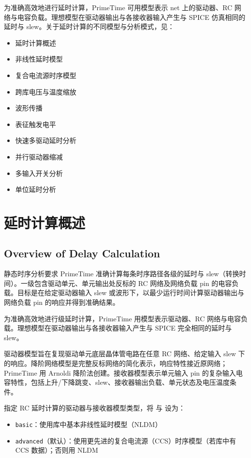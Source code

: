 \label{chap:delay}

为准确高效地进行延时计算，PrimeTime 可用模型表示 net 上的驱动器、RC 网络与电容负载。理想模型在驱动器输出与各接收器输入产生与 SPICE 仿真相同的延时与 slew。关于延时计算的不同模型与分析模式，见：
\begin{itemize}
  \item 延时计算概述
  \item 非线性延时模型
  \item 复合电流源时序模型
  \item 跨库电压与温度缩放
  \item 波形传播
  \item 表征触发电平
  \item 快速多驱动延时分析
  \item 并行驱动器缩减
  \item 多输入开关分析
  \item 单位延时分析
\end{itemize}

\section{延时计算概述}
\subsection*{Overview of Delay Calculation}

静态时序分析要求 PrimeTime 准确计算每条时序路径各级的延时与 slew（转换时间）。一级包含驱动单元、单元输出处反标的 RC 网络及网络负载 pin 的电容负载。目标是在给定驱动器输入 slew 或波形下，以最少运行时间计算驱动器输出与网络负载 pin 的响应并得到准确结果。

为准确高效地进行级延时计算，PrimeTime 用模型表示驱动器、RC 网络与电容负载。理想模型在驱动器输出与各接收器输入产生与 SPICE 完全相同的延时与 slew。


驱动器模型旨在复现驱动单元底层晶体管电路在任意 RC 网络、给定输入 slew 下的响应。降阶网络模型是完整反标网络的简化表示，响应特性接近原网络；PrimeTime 用 Arnoldi 降阶法创建。接收器模型表示单元输入 pin 的复杂输入电容特性，包括上升/下降跳变、slew、接收器输出负载、单元状态及电压温度条件。

指定 RC 延时计算的驱动器与接收器模型类型，将  与  设为：
\begin{itemize}
  \item \texttt{basic}：使用库中基本非线性延时模型（NLDM）
  \item \texttt{advanced}（默认）：使用更先进的复合电流源（CCS）时序模型（若库中有 CCS 数据）；否则用 NLDM
\end{itemize}

